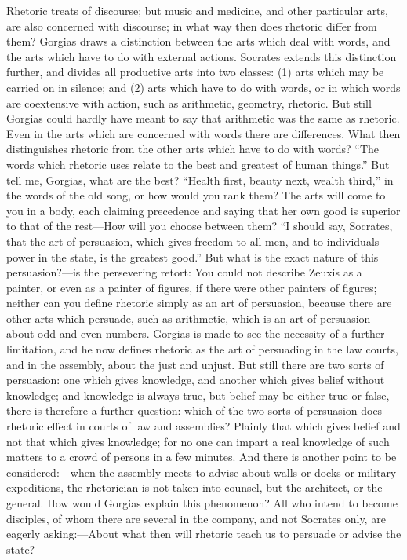 \documentclass[11pt,letter]{article}
\begin{document}
\par  Rhetoric treats of discourse; but music and medicine, and other particular arts, are also concerned with discourse; in what way then does rhetoric differ from them? Gorgias draws a distinction between the arts which deal with words, and the arts which have to do with external actions. Socrates extends this distinction further, and divides all productive arts into two classes: (1) arts which may be carried on in silence; and (2) arts which have to do with words, or in which words are coextensive with action, such as arithmetic, geometry, rhetoric. But still Gorgias could hardly have meant to say that arithmetic was the same as rhetoric. Even in the arts which are concerned with words there are differences. What then distinguishes rhetoric from the other arts which have to do with words? “The words which rhetoric uses relate to the best and greatest of human things.” But tell me, Gorgias, what are the best? “Health first, beauty next, wealth third,” in the words of the old song, or how would you rank them? The arts will come to you in a body, each claiming precedence and saying that her own good is superior to that of the rest—How will you choose between them? “I should say, Socrates, that the art of persuasion, which gives freedom to all men, and to individuals power in the state, is the greatest good.” But what is the exact nature of this persuasion?—is the persevering retort: You could not describe Zeuxis as a painter, or even as a painter of figures, if there were other painters of figures; neither can you define rhetoric simply as an art of persuasion, because there are other arts which persuade, such as arithmetic, which is an art of persuasion about odd and even numbers. Gorgias is made to see the necessity of a further limitation, and he now defines rhetoric as the art of persuading in the law courts, and in the assembly, about the just and unjust. But still there are two sorts of persuasion: one which gives knowledge, and another which gives belief without knowledge; and knowledge is always true, but belief may be either true or false,—there is therefore a further question: which of the two sorts of persuasion does rhetoric effect in courts of law and assemblies? Plainly that which gives belief and not that which gives knowledge; for no one can impart a real knowledge of such matters to a crowd of persons in a few minutes. And there is another point to be considered:—when the assembly meets to advise about walls or docks or military expeditions, the rhetorician is not taken into counsel, but the architect, or the general. How would Gorgias explain this phenomenon? All who intend to become disciples, of whom there are several in the company, and not Socrates only, are eagerly asking:—About what then will rhetoric teach us to persuade or advise the state?
\end{document}
